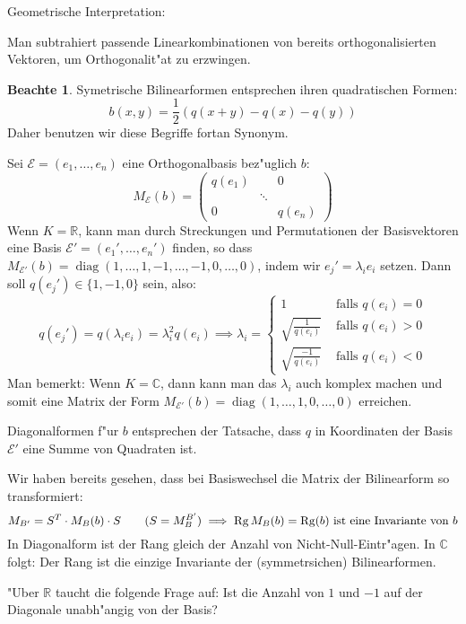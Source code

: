 \documentclass[oneside,fontsize=11pt,paper=a4,BCOR=0mm,DIV=12,automark,headsepline]{scrbook}
\DeclareMathOperator{\mRg}{Rg}
\DeclareMathOperator{\mDiag}{diag}
\theoremstyle{remark}
\theoremstyle{definition}
\newtheorem*{notte}{Beachte}
\theoremstyle{definition}
\theoremstyle{remark}
\begin{document}
Geometrische Interpretation:
\begin{relation}
  Man subtrahiert passende Linearkombinationen von bereits orthogonalisierten
  Vektoren, um Orthogonalit"at zu erzwingen.
\end{relation}
\begin{notte}
  Symetrische Bilinearformen entsprechen ihren quadratischen Formen:
  \[
    b(x,y) = \frac{1}{2}(q(x+y)-q(x)-q(y))
  \]
  Daher benutzen wir diese Begriffe fortan Synonym.
\end{notte}
Sei \(\mathcal{E} = (e_1,\dots,e_n)\) eine Orthogonalbasis bez"uglich \(b\):
\[M_{\mathcal{E}}(b) =
  \begin{pmatrix}
    q(e_1) & & 0 \\
    & \ddots & \\
    0 & & q(e_n)
  \end{pmatrix}
\]
Wenn \(K=\mathbb{R}\), kann man durch Streckungen und Permutationen der Basisvektoren eine Basis \(\mathcal{E}' = (e_1',\dots,e_n')\) finden, so dass \(M_{\mathcal{E}'}(b) = \mDiag (1,\dots,1,-1,\dots,-1,0,\dots,0)\), indem wir \(e_j' = \lambda_ie_i\) setzen. Dann soll \(q(e_j') \in \{1, -1, 0\}\) sein, also: \[q(e_j') = q(\lambda_ie_i) = \lambda_i^2q(e_i) \implies \lambda_i =
  \begin{cases}
    1 & \text{ falls } q(e_i) = 0 \\
    \sqrt{\frac{1}{q(e_i)}} & \text{ falls } q(e_i) > 0 \\
    \sqrt{\frac{-1}{q(e_i)}} & \text{ falls } q(e_i) < 0
  \end{cases}
\]
Man bemerkt: Wenn \(K=\mathbb{C}\), dann kann man das \(\lambda_i\) auch komplex machen und somit eine Matrix der Form \(M_{\mathcal{E}'}(b) = \mDiag (1,\dots,1, 0,\dots, 0)\) erreichen.
\begin{relation}
  Diagonalformen f"ur $b$ entsprechen der Tatsache, dass $q$ in Koordinaten der
  Basis $\mathcal{E}'$ eine Summe von Quadraten ist.

  Wir haben bereits gesehen, dass bei Basiswechsel die Matrix der Bilinearform
  so transformiert:
  \[
    M_{B'}=S^T\cdot M_B(b)\cdot S\qquad (S = M_B^{B'}) \\
    \implies \mRg M_B(b)=\mRg (b) \text{ ist eine Invariante von } b
  \]
  In Diagonalform ist der Rang gleich der Anzahl von Nicht-Null-Eintr"agen. In
  $\mathbb{C}$ folgt: Der Rang ist die einzige Invariante der (symmetrsichen)
  Bilinearformen.

  "Uber $\mathbb{R}$ taucht die folgende Frage auf: Ist die Anzahl von $1$ und
  $-1$ auf der Diagonale unabh"angig von der Basis?
\end{relation}
\end{document}
